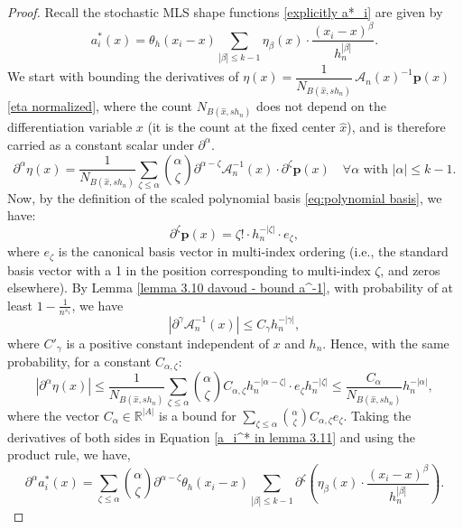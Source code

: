 \documentclass{article}
\begin{document}
\begin{proof}
Recall the stochastic MLS shape functions \eqref{explicitly a*_i} are given by
\begin{equation}
     a_i^*(x)=\theta_h(x_i-x) \sum_{|\beta| \leq k-1} \eta_\beta(x) \cdot \frac{\left(x_i-x\right)^\beta}{h_n^{|\beta|}} .
     \label{a_i^* in lemma 3.11}
\end{equation}
We start with bounding the derivatives of $\eta(x)=\dfrac{1}{N_{B(\hat{x}, s h_n)}}\,\mathscr{A}_n(x)^{-1} \boldsymbol{p}(x)$ \eqref{eta normalized}, where the count $N_{B(\hat{x}, s h_n)}$ does not depend on the differentiation variable $x$ (it is the count at the fixed center $\hat{x}$), and is therefore carried as a constant scalar under $\partial^\alpha$.
\begin{equation*}
    \partial^\alpha \eta(x)=\frac{1}{N_{B(\hat{x}, s h_n)}}\sum_{\zeta \leq \alpha}\binom{\alpha}{\zeta} \partial^{\alpha-\zeta} \mathscr{A}_n^{-1}(x) \cdot \partial^\zeta \boldsymbol{p}(x) \quad \forall \alpha \text { with }|\alpha| \leqslant k-1 .
\end{equation*}
Now, by the definition of the scaled polynomial basis \eqref{eq:polynomial basis}, we have:
$$
\partial^\zeta \boldsymbol{p}(x)=\zeta!\cdot h_n^{-|\zeta|} \cdot e_\zeta,
$$
where $e_\zeta$ is the canonical basis vector in multi-index ordering (i.e., the standard basis vector with a 1 in the position corresponding to multi-index $\zeta$, and zeros elsewhere).
By Lemma \ref{lemma 3.10 davoud - bound a^-1}, with probability of at least $1-\frac{1}{n^{s_1 }}$, we have
$$
\left|\partial^\gamma \mathscr{A}_n^{-1}(x)\right| \leq C_\gamma h_n^{-|\gamma|},
$$
where $C'_\gamma$ is a positive constant independent of $x$ and $h_n$. 
Hence, with the same probability, for a constant $C_{\alpha,\zeta}$:
\begin{equation}
    \left|\partial^\alpha \eta(x)\right| \leq \frac{1}{N_{B(\hat{x}, s h_n)}}\sum_{\zeta \leq \alpha}\binom{\alpha}{\zeta} {C_{\alpha, \zeta} h_n^{-|\alpha-\zeta|}} \cdot e_\zeta h_n^{-|\zeta|} \leq \frac{C_{\alpha}}{N_{B(\hat{x}, s h_n)}} h_n^{-|\alpha|} ,
    \label{eq:bound on eta}
\end{equation}
where the vector $C_\alpha\in\mathbb{R}^{|A|}$ is a bound for $\sum_{\zeta \leqslant \alpha}\binom{\alpha}{\zeta} C_{\alpha, \zeta} e_\zeta$.
Taking the derivatives of both sides in Equation \eqref{a_i^* in lemma 3.11} and using the product rule, we have,
\begin{equation*}
    \partial^\alpha a_i^*(x)=\sum_{\zeta \leq \alpha}\binom{\alpha}{\zeta} \partial^{\alpha-\zeta} \theta_h(x_i-x) \sum_{|\beta| \leq k-1} \partial^\zeta \left(\eta_\beta(x) \cdot \frac{\left(x_i-x\right)^\beta}{h_n^{|\beta|}}\right) .

\end{equation*}
\end{proof}
\end{document}
